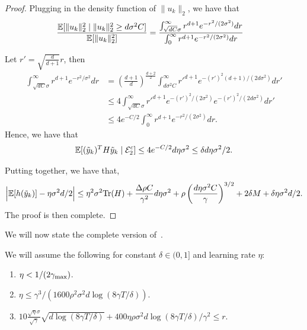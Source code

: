 \begin{proof}
    Plugging in the density function of $\|u_k\|_2$, we have that
    \begin{align*}
    \frac{\mathbb{E}[\|u_k\|_2^2 \mid \| u_k \|_2^2 \ge d \sigma^2 C]}{\mathbb{E}[\|u_k\|_2^2]} &= \frac{\int_{\sqrt{dC} \sigma }^{\infty} r^{d + 1 } e^{-r^2/(2\sigma^2)} dr}{\int_{0}^{\infty} r^{d + 1 } e^{-r^2/(2\sigma^2)} dr} 
    \end{align*}

    Let $r' = \sqrt{\frac{d}{d + 1}} r$, then 
    \begin{align*}
        \int_{\sqrt{dC} \sigma}^{\infty} r^{d + 1 } e^{-r^2/\sigma^2} dr &= (\frac{d + 1}{d })^{\frac{d + 2}{2}} \int_{d \sigma^2 C}^{\infty} r'^{d + 1} e^{-(r')^2 (d + 1)/ (2 d \sigma^2)} dr' \\
        &\le 4 \int_{\sqrt{dC} \sigma}^{\infty} r'^{d + 1} e^{-(r')^2 / (2\sigma^2)}  e^{-(r')^2/(2d \sigma^2)}  dr' \\
        &\le 4 e^{-C / 2} \int_{0}^{\infty} r^{d + 1 } e^{-r^2/(2\sigma^2)} dr.
    \end{align*}
    Hence, we have that 
    \begin{align*}
        \mathbb{E}[(\tilde y_k)^T H \tilde y_k \mid \mathcal{E}_2^c] \le 4 e^{-C / 2} d \eta \sigma^2 \le \delta d \eta \sigma^2 / 2.
    \end{align*}

    Putting together, we have that,
    \begin{align*}
        \Big | \mathbb{E}[h(\tilde y_k)] -  \eta \sigma^2d / 2\Big|\le \eta^2 \sigma^2 \mathrm{Tr}(H) + \frac{ \Delta \rho C}{\gamma^2} d \eta  \sigma^2 + \rho \left( \frac{ d \eta \sigma^2  C}{{\gamma}} \right)^{3/2} + 2\delta M + \delta \eta \sigma^2 d / 2.
    \end{align*}
    The proof is then complete.
\end{proof}












    

We will now state the complete version of~.

\begin{assumption}
\label{assum:regular-L}
We will assume the following for constant $\delta \in (0,1]$ and learning rate $\eta$:
    \begin{enumerate}
        \item $\eta < 1/(2\gamma_{\mathrm{max}})$.
        \item $\eta \le {\gamma^3}/{(1600 \rho^2 \sigma^2 d \log(8\gamma T/\delta))}$.
        \item $10\frac{\sqrt{\eta} \sigma}{\sqrt{\gamma}} \sqrt{d \log(8 \gamma T / \delta)} + 400 \eta \rho \sigma^2 d \log(8 \gamma T / \delta) / \gamma^2 \le r$.
    \end{enumerate}
\end{assumption}





